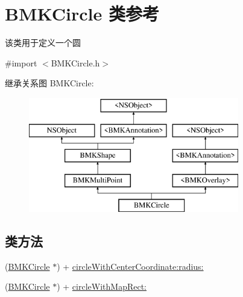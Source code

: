 \hypertarget{interface_b_m_k_circle}{\section{B\-M\-K\-Circle 类参考}
\label{interface_b_m_k_circle}
}


该类用于定义一个圆  




{\ttfamily \#import $<$B\-M\-K\-Circle.\-h$>$}

继承关系图 B\-M\-K\-Circle\-:\begin{figure}[H]
\begin{center}
\leavevmode
\includegraphics[height=5.000000cm]{interface_b_m_k_circle}
\end{center}
\end{figure}
\subsection*{类方法}
\begin{DoxyCompactItemize}
\item 
(\hyperlink{interface_b_m_k_circle}{B\-M\-K\-Circle} $\ast$) + \hyperlink{interface_b_m_k_circle_a82a7234e92fda719b74d6055ee30d360}{circle\-With\-Center\-Coordinate\-:radius\-:}
\item 
(\hyperlink{interface_b_m_k_circle}{B\-M\-K\-Circle} $\ast$) + \hyperlink{interface_b_m_k_circle_af4109f36f784b80a758a0b48c636e4a7}{circle\-With\-Map\-Rect\-:}
\end{DoxyCompactItemize}
